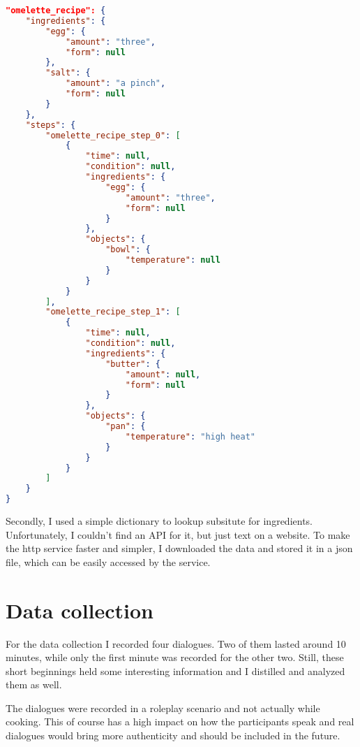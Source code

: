 \documentclass[
	11pt, %
]{fphw}
\begin{document}
\begin{lstlisting}[language=json, caption={Example of recipe loopup},captionpos=b]
"omelette_recipe": {
    "ingredients": {
        "egg": {
            "amount": "three",
            "form": null
        },
        "salt": {
            "amount": "a pinch",
            "form": null
        }
    },
    "steps": {
        "omelette_recipe_step_0": [
            {
                "time": null,
                "condition": null,
                "ingredients": {
                    "egg": {
                        "amount": "three",
                        "form": null
                    }
                },
                "objects": {
                    "bowl": {
                        "temperature": null
                    }
                }
            }
        ],
        "omelette_recipe_step_1": [
            {
                "time": null,
                "condition": null,
                "ingredients": {
                    "butter": {
                        "amount": null,
                        "form": null
                    }
                },
                "objects": {
                    "pan": {
                        "temperature": "high heat"
                    }
                }
            }
        ]
    }
}
\end{lstlisting}

Secondly, I used a simple dictionary to lookup subsitute for ingredients. Unfortunately, I couldn't find an API for it, but just text on a website. To make the http service faster and simpler, I downloaded the data and stored it in a json file, which can be easily accessed by the service.

\section*{Data collection}
For the data collection I recorded four dialogues. Two of them lasted around 10 minutes, while only the first minute was recorded for the other two. Still, these short beginnings held some interesting information and I distilled and analyzed them as well.

The dialogues were recorded in a roleplay scenario and not actually while cooking. This of course has a high impact on how the participants speak and real dialogues would bring more authenticity and should be included in the future.
\end{document}
